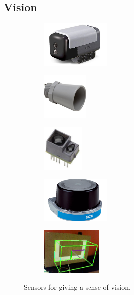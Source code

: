 \subsection{Vision}

\begin{figure}[H]
\begin{subfigure}[b]{.19\linewidth}
\includegraphics[height=0.9in]{imgs/sensor_color.jpeg}
\end{subfigure}\begin{subfigure}[b]{.19\linewidth}
\includegraphics[height=0.9in]{imgs/sensor_ultrasonic.jpeg}
\end{subfigure}\begin{subfigure}[b]{.19\linewidth}
\includegraphics[height=0.9in]{imgs/sensor_tof.jpeg}
\end{subfigure}\begin{subfigure}[b]{.19\linewidth}
\includegraphics[height=0.9in]{imgs/sensor_lidar.png}
\end{subfigure}\begin{subfigure}[b]{.19\linewidth}
\includegraphics[height=0.9in]{imgs/sensor_cv.png}
\end{subfigure}
\caption{Sensors for giving a sense of vision.}
\end{figure}

